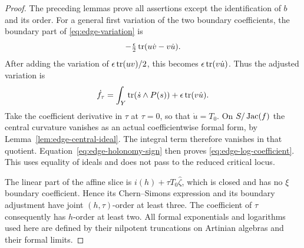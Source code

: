 \begin{proof}
The preceding lemmas prove all assertions except the identification
of $b$ and its order.  For a general first variation of the two
boundary coefficients, the boundary part of
\eqref{eq:edge-variation} is
\[
 -\tfrac{\epsilon}{2}\operatorname{tr}(u\dot v-v\dot u).
\]
After adding the variation of $\epsilon\operatorname{tr}(uv)/2$, this becomes
$\epsilon\operatorname{tr}(v\dot u)$.  Thus the adjusted variation is
\begin{equation}
\label{eq:edge-adjusted-variation}
 \dot f_\tau
    =\int_Y\operatorname{tr}(\dot s\wedge P(s))
                      +\epsilon\operatorname{tr}(v\dot u).
\end{equation}
Take the coefficient derivative in $\tau$ at $\tau=0$, so that
$\dot u=T_0$.  On $S/\operatorname{Jac}(f)$ the central curvature vanishes as an
actual coefficientwise formal form, by
Lemma~\ref{lem:edge-central-ideal}.  The integral term therefore
vanishes in that quotient.  Equation~\eqref{eq:edge-holonomy-sign}
then proves \eqref{eq:edge-log-coefficient}.  This uses equality of
ideals and does not pass to the reduced critical locus.

The linear part of the affine slice is
$i(h)+\tau T_0\widehat\zeta$, which is closed and has no $\xi$
boundary coefficient.  Hence its Chern--Simons expression and its
boundary adjustment have joint $(h,\tau)$-order at least three.
The coefficient of $\tau$ consequently has $h$-order at least two.
All formal exponentials and logarithms used here are defined by their
nilpotent truncations on Artinian algebras and their formal limits.
\end{proof}

